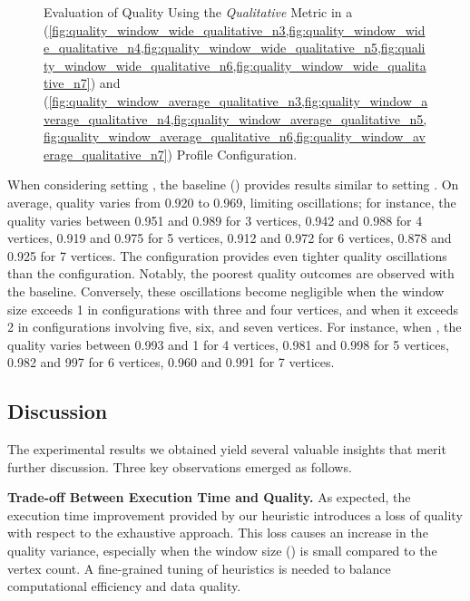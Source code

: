 \begin{figure}[H]
\begin{adjustbox}{minipage=\linewidth,scale=0.75}
    \caption{Evaluation of Quality Using the \emph{Qualitative} Metric in a \wide (\cref{fig:quality_window_wide_qualitative_n3,fig:quality_window_wide_qualitative_n4,fig:quality_window_wide_qualitative_n5,fig:quality_window_wide_qualitative_n6,fig:quality_window_wide_qualitative_n7}) and \average (\cref{fig:quality_window_average_qualitative_n3,fig:quality_window_average_qualitative_n4,fig:quality_window_average_qualitative_n5,fig:quality_window_average_qualitative_n6,fig:quality_window_average_qualitative_n7}) Profile Configuration.}  \label{fig:quality_window_qualitative}
  \end{adjustbox}
\end{figure}

When considering setting \average, the baseline () provides results similar to setting \wide. On average, quality varies from 0.920 to 0.969, limiting oscillations; for instance, the quality varies between 0.951 and 0.989 for 3 vertices, 0.942 and 0.988 for 4 vertices, 0.919 and 0.975 for 5 vertices, 0.912 and 0.972 for 6 vertices, 0.878 and 0.925 for 7 vertices. The \average configuration provides even tighter quality oscillations than the \wide configuration. Notably, the poorest quality outcomes are observed with the baseline. Conversely, these oscillations become negligible when the window size exceeds 1 in configurations with three and four vertices, and when it exceeds 2 in configurations involving five, six, and seven vertices.  For instance, when , the quality varies between  0.993 and 1 for 4 vertices, 0.981 and 0.998 for 5 vertices, 0.982 and 997 for 6 vertices, 0.960 and 0.991 for 7 vertices.


\subsection{Discussion}
The experimental results we obtained yield several valuable insights that merit further discussion. Three key observations emerged as follows.

\vspace{0.5em}

\noindent\textbf{Trade-off Between Execution Time and Quality.} As expected, the execution time improvement provided by our heuristic introduces a loss of quality with respect to the exhaustive approach. This loss causes an increase in the quality variance, especially when the window size (\windowsize) is small compared to the vertex count. A fine-grained tuning of heuristics is needed to balance computational efficiency and data quality.

